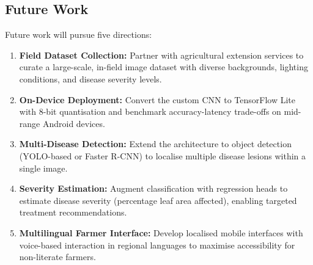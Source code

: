\subsection{Future Work}

Future work will pursue five directions:

\begin{enumerate}[label=\textcolor{accent}{\textbullet}, leftmargin=2em, itemsep=3pt]
  \item \textbf{Field Dataset Collection:} Partner with agricultural
        extension services to curate a large-scale, in-field image dataset
        with diverse backgrounds, lighting conditions, and disease severity
        levels.
  \item \textbf{On-Device Deployment:} Convert the custom CNN to TensorFlow
        Lite with 8-bit quantisation and benchmark accuracy-latency trade-offs
        on mid-range Android devices.
  \item \textbf{Multi-Disease Detection:} Extend the architecture to object
        detection (YOLO-based or Faster R-CNN) to localise multiple disease
        lesions within a single image.
  \item \textbf{Severity Estimation:} Augment classification with regression
        heads to estimate disease severity (percentage leaf area affected),
        enabling targeted treatment recommendations.
  \item \textbf{Multilingual Farmer Interface:} Develop localised mobile
        interfaces with voice-based interaction in regional languages to
        maximise accessibility for non-literate farmers.
\end{enumerate}

